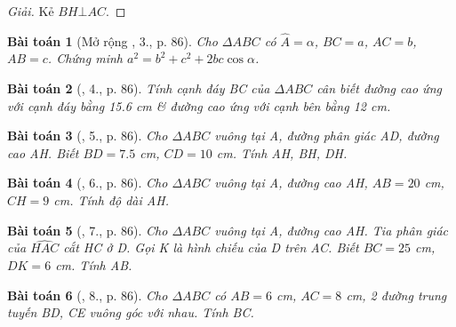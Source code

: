 \documentclass{article}
\newtheorem{baitoan}{Bài toán}
\begin{document}
\begin{center}
\end{center}

\begin{proof}[Giải]
	Kẻ $BH\bot AC$.
\end{proof}

\begin{baitoan}[Mở rộng \cite{Binh_Toan_9_tap_1}, 3., p. 86]
	Cho $\Delta ABC$ có $\widehat{A} = \alpha$, $BC = a$, $AC = b$, $AB = c$. Chứng minh $a^2 = b^2 + c^2 + 2bc\cos\alpha$.
\end{baitoan}

\begin{baitoan}[\cite{Binh_Toan_9_tap_1}, 4., p. 86]
	Tính cạnh đáy BC của $\Delta ABC$ cân biết đường cao ứng với cạnh đáy bằng {\rm15.6 cm} \& đường cao ứng với cạnh bên bằng {\rm12 cm}.
\end{baitoan}

\begin{baitoan}[\cite{Binh_Toan_9_tap_1}, 5., p. 86]
	Cho $\Delta ABC$ vuông tại A, đường phân giác AD, đường cao AH. Biết $BD = 7.5$ {\rm cm}, $CD = 10$ {\rm cm}. Tính AH, BH, DH.
\end{baitoan}

\begin{baitoan}[\cite{Binh_Toan_9_tap_1}, 6., p. 86]
	Cho $\Delta ABC$ vuông tại A, đường cao AH, $AB = 20$ {\rm cm}, $CH = 9$ {\rm cm}. Tính độ dài AH.
\end{baitoan}

\begin{baitoan}[\cite{Binh_Toan_9_tap_1}, 7., p. 86]
	Cho $\Delta ABC$ vuông tại A, đường cao AH. Tia phân giác của $\widehat{HAC}$ cắt HC ở D. Gọi K là hình chiếu của D trên AC. Biết $BC = 25$ {\rm cm}, $DK = 6$ {\rm cm}. Tính AB.
\end{baitoan}

\begin{baitoan}[\cite{Binh_Toan_9_tap_1}, 8., p. 86]
	Cho $\Delta ABC$ có $AB = 6$ {\rm cm}, $AC = 8$ {\rm cm}, 2 đường trung tuyến BD, CE vuông góc với nhau. Tính BC.
\end{baitoan}
\end{document}
